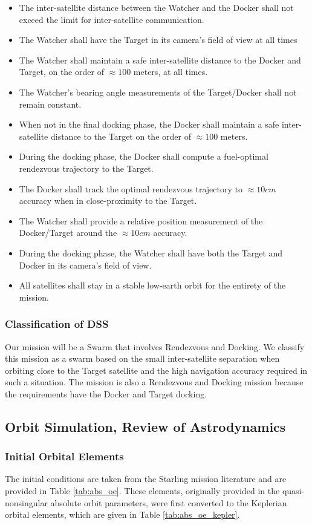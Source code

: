 \begin{itemize}
    \item The inter-satellite distance between the Watcher and the Docker shall not exceed the limit for inter-satellite communication.
    \item The Watcher shall have the Target in its camera's field of view at all times 
    \item The Watcher shall maintain a safe inter-satellite distance to the Docker and Target, on the order of $\approx100$ meters, at all times.
    \item The Watcher's bearing angle measurements of the Target/Docker shall not remain constant.
    \item When not in the final docking phase, the Docker shall maintain a safe inter-satellite distance to the Target on the order of $\approx 100$ meters.
    \item During the docking phase, the Docker shall compute a fuel-optimal rendezvous trajectory to the Target.
    \item The Docker shall track the optimal rendezvous trajectory to $\approx 10 cm$ accuracy when in close-proximity to the Target.
    \item The Watcher shall provide a relative position measurement of the Docker/Target around the $\approx 10 cm$ accuracy.
    \item During the docking phase, the Watcher shall have both the Target and Docker in its camera's field of view.
    \item All satellites shall stay in a stable low-earth orbit for the entirety of the mission.
\end{itemize}


\subsubsection{Classification of DSS} 
Our mission will be a Swarm that involves Rendezvous and Docking. We classify this mission as a swarm based on the small inter-satellite separation when orbiting close to the Target satellite and the high navigation accuracy required in such a situation. The mission is also a Rendezvous and Docking mission because the requirements have the Docker and Target docking.

\subsection{Orbit Simulation, Review of Astrodynamics}
\subsubsection{Initial Orbital Elements} \label{sec:initial_oe}
The initial conditions are taken from the Starling mission literature \cite{krugerorbit} and are provided in Table \ref{tab:abs_oe}. These elements, originally provided in the quasi-nonsingular absolute orbit parameters, were first converted to the Keplerian orbital elements, which are given in Table \ref{tab:abs_oe_kepler}.

